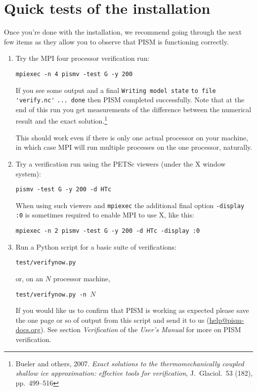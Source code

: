 \documentclass[11pt,final]{amsart}
\begin{document}
\section{Quick tests of the installation}
Once you're done with the installation, we recommend going through the next few items as they allow you to observe
that PISM is functioning correctly.
\begin{enumerate}
\item Try the MPI four processor verification run:

\verb|mpiexec -n 4 pismv -test G -y 200|

\noindent If you see some output and a final \verb|Writing model state| \verb|to file 'verify.nc'| \verb|... done| then PISM
completed successfully. Note that at the end of this run you get measurements of the difference between the numerical result and
the exact solution.\footnote{Bueler and others, 2007.  \emph{Exact solutions to the thermomechanically coupled shallow ice approximation: effective tools for verification}, J.~Glaciol.~53 (182), pp.~499--516}

\noindent This should work even if there is only one actual processor on your machine, in which case MPI will run multiple
processes on the one processor, naturally.

\item Try a verification run using the PETSc viewers (under the X window system):

\verb|pismv -test G -y 200 -d HTc|

\noindent When using such viewers and \verb|mpiexec| the additional final option \verb|-display :0| is sometimes required to enable MPI to use X, like this:

\verb|mpiexec -n 2 pismv -test G -y 200 -d HTc -display :0|

\item Run a Python script for a basic suite of verifications:

\verb|test/verifynow.py|

\noindent or, on an $N$ processor machine,

\verb|test/verifynow.py -n |$N$

\noindent If you would like us to confirm that PISM is working as expected please save the one page or so of output from this script and send it to us (\href{mailto:help@pism-docs.org}{help@pism-docs.org}).  See section \emph{Verification} of the \emph{User's Manual} for more on PISM verification.
\end{enumerate}
\end{document}
